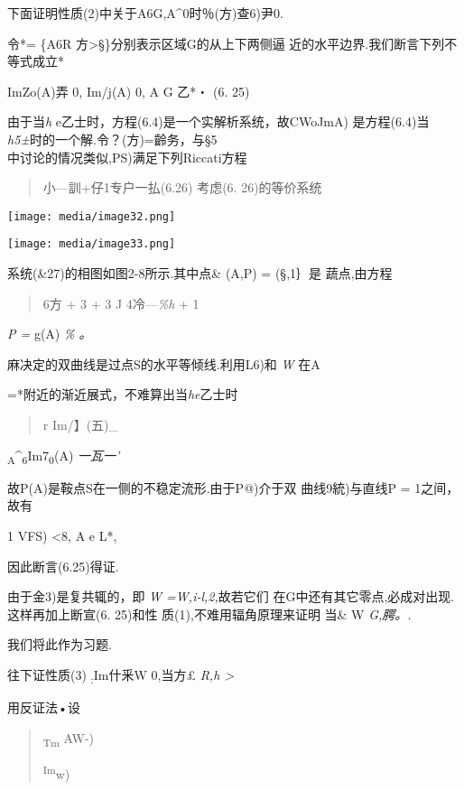 \documentclass{article}
\begin{document}
下面证明性质(2)中关于A6G,A\^{}0时％(方)查6)尹0.

令*= \{A6R \textbar{}方\textgreater{}§\}分别表示区域G的从上下两侧逼
近的水平边界.我们断言下列不等式成立*

ImZo(A)弄 0, Im/j(A) 0, A G 乙*・ (6. 25)

由于当\emph{h} e乙士时，方程(6.4)是一个实解析系统，故CWoJmA)
是方程(6.4)当\emph{h5±}时的一个解.令？(方)=齡务，与§5\\
中讨论的情况类似,PS)满足下列Riccati方程

\begin{quote}
小---訓+仔1专户一払(6.26) 考虑(6. 26)的等价系统
\end{quote}

\texttt{[image: media/image32.png]}

\texttt{[image: media/image33.png]}

系统(\&27)的相图如图2-8所示.其中点\& (A,P) = (§,1｝是 蔬点,由方程

\begin{quote}
6方 + 3 + 3 J 4冷---\emph{\%h} + 1
\end{quote}

\emph{P =} g(A) \emph{\% 。 }

麻决定的双曲线是过点S的水平等倾线.利用L6)和 \emph{W} 在A

=*附近的渐近展式，不难算出当\emph{he}乙士时

\begin{quote}
r {Im/】(五)}\_
\end{quote}

\textsubscript{A}\^{}\textsubscript{6}Im7\textsubscript{0}(A)
\emph{一瓦一'}

故P(A)是鞍点S在一侧的不稳定流形.由于P@)介于双 曲线9統)与直线P =
1之间，故有

1 VFS) \textless{}8, A e L*,

因此断言(6.25)得证.

由于金3)是复共辄的，即 \emph{W =W,i-l,2,}故若它们
在G中还有其它零点,必成对出现.这样再加上断宣(6. 25)和性
质(1),不难用辐角原理来证明 当\& W \emph{G,腭。.}

我们将此作为习题.

往下证性质(3) \textsubscript{:}Im什釆W 0,当方£ \emph{R,h \textgreater{}}

用反证法•设

\begin{quote}
\textsubscript{Tm} AW-)

\textsuperscript{Im}w)
\end{quote}
\end{document}
